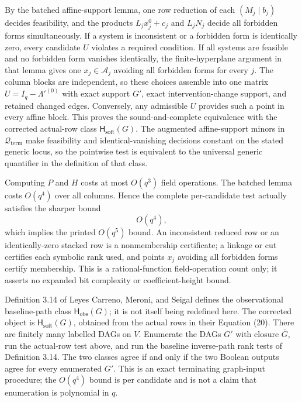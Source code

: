 By the batched affine-support lemma, one row reduction of each \((M_j\mid b_j)\) decides feasibility, and the products \(L_jx_j^0+c_j\) and \(L_jN_j\) decide all forbidden forms simultaneously.  If a system is inconsistent or a forbidden form is identically zero, every candidate \(U\) violates a required condition.  If all systems are feasible and no forbidden form vanishes identically, the finite-hyperplane argument in that lemma gives one \(x_j\in\mathcal A_j\) avoiding all forbidden forms for every \(j\).  The column blocks are independent, so these choices assemble into one matrix \(U=I_q-\Lambda'^{(0)}\) with exact support \(G'\), exact intervention-change support, and retained changed edges.  Conversely, any admissible \(U\) provides such a point in every affine block.  This proves the sound-and-complete equivalence with the corrected actual-row class \(\mathsf H_{\mathrm{soft}}(G)\).  The augmented affine-support minors in \(\mathcal Q_{\mathrm{term}}\) make feasibility and identical-vanishing decisions constant on the stated generic locus, so the pointwise test is equivalent to the universal generic quantifier in the definition of that class.

Computing \(P\) and \(H\) costs at most \(O(q^3)\) field operations.  The batched lemma costs \(O(q^4)\) over all columns.  Hence the complete per-candidate test actually satisfies the sharper bound
\[
 O(q^4),
\]
which implies the printed \(O(q^5)\) bound.  An inconsistent reduced row or an identically-zero stacked row is a nonmembership certificate; a linkage or cut certifies each symbolic rank used, and points \(x_j\) avoiding all forbidden forms certify membership.  This is a rational-function field-operation count only; it asserts no expanded bit complexity or coefficient-height bound.

Definition 3.14 of Leyes Carreno, Meroni, and Seigal defines the observational baseline-path class \(\mathsf H_{\mathrm{obs}}(G)\); it is not itself being redefined here.  The corrected object is \(\mathsf H_{\mathrm{soft}}(G)\), obtained from the actual rows in their Equation (20).  There are finitely many labelled DAGs on \(V\).  Enumerate the DAGs \(G'\) with closure \(\overline G\), run the actual-row test above, and run the baseline inverse-path rank tests of Definition 3.14.  The two classes agree if and only if the two Boolean outputs agree for every enumerated \(G'\).  This is an exact terminating graph-input procedure; the \(O(q^4)\) bound is per candidate and is not a claim that enumeration is polynomial in \(q\).

